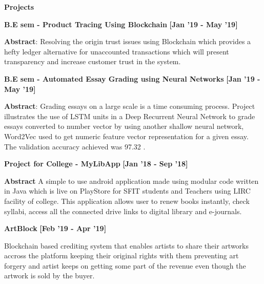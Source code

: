 \colorbox{titleColor}{\parbox{6.7in}{\textbf{Projects}}}

\begin{itemize*}
  \setlength{\itemsep}{1pt}
  
  
  \item \textbf{B.E sem  - Product Tracing Using Blockchain} \hfill{\small{{\textbf{[Jan '19 - May '19]}}\/}}
    \begin{itemize*}
      \setlength{\itemsep}{.00pt}
          \item \textbf{Abstract}: Resolving the origin trust issues using Blockchain which provides a hefty ledger alternative for unaccounted transactions which will present transparency and increase customer trust in the system.
    \end{itemize*}
    
    
    \item \textbf{B.E sem  - Automated Essay Grading using Neural Networks} \hfill {\small{{\textbf{[Jan '19 - May '19]}}\/}}
    \begin{itemize*}
      \setlength{\itemsep}{.00pt}
          \item \textbf{Abstract}: Grading essays on a large scale is a time consuming process. Project illustrates the use of LSTM units in a Deep Recurrent Neural Network to grade essays converted to number vector by using another shallow neural network, Word2Vec used to get numeric feature vector representation for a given essay. The validation accuracy achieved was 97.32 .
    \end{itemize*}
    
    
    \item \textbf{Project for College - MyLibApp} \hfill {\small{{\textbf{[Jan '18 - Sep '18]}}\/}}
    \begin{itemize*}
      \setlength{\itemsep}{.00pt}
          \item \textbf{Abstract} A simple to use android application made using modular code written in Java which is live on PlayStore for SFIT students and Teachers using LIRC facility of college. This application allows user to renew books instantly, check syllabi, access all the connected drive links to digital library and e-journals.
    \end{itemize*}

    \item \textbf{\small{ArtBlock}} \hfill {\small{{\textbf{[Feb '19 - Apr '19]}}}\/}
    \begin{itemize*}
    	\item Blockchain based crediting system that enables artists to share their artworks accross the platform keeping their original rights with them preventing art forgery and artist keeps on getting some part of the revenue even though the artwork is sold by the buyer.
    \end{itemize*}



\end{itemize*}
